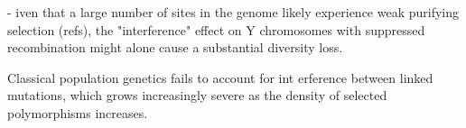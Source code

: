 \documentclass[9pt,twocolumn,twoside]{gsajnl}
\begin{document}
- iven that a large number of sites in the genome likely experience weak purifying selection (\X refs), the "interference" effect on Y chromosomes with suppressed recombination might alone cause a substantial diversity loss.



Classical population genetics fails to account for int
erference between linked mutations, which grows increasingly severe as the density of selected polymorphisms increases.










\end{document}

